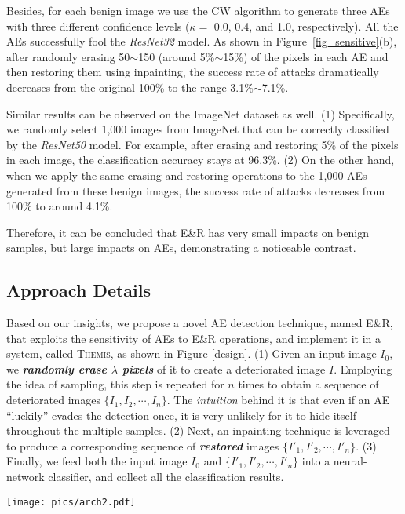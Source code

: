 \documentclass[sigconf]{acmart}
\newcommand{\oursys}{\textsc{Themis}\xspace}
\begin{document}
Besides, for each benign image we use the CW algorithm to generate three AEs  with three 
different confidence levels ($\kappa=$ 0.0, 0.4, and 1.0, respectively). 
All the AEs successfully 
fool the \emph{ResNet32} model. As shown in Figure~\ref{fig_sensitive}(b), after 
randomly erasing  50$\sim$150 (around 5\%$\sim$15\%) of the pixels in each AE and then restoring them using inpainting, the success rate of attacks dramatically decreases from the original 100\% to the range 3.1\%$\sim$7.1\%. 

Similar results can be observed on the ImageNet dataset as well. (1) Specifically, we randomly select
1,000 images from ImageNet that can be correctly classified by the \emph{ResNet50} model. For example,
after erasing and restoring 5\% of the pixels in each image, the classification accuracy 
stays at 96.3\%. (2) On the other hand, when we apply the same erasing and restoring operations to 
the 1,000  AEs generated from 
these benign images, the success rate of attacks decreases from 100\% to around 4.1\%. 

Therefore,  it can be concluded that E\&R has very small impacts on benign samples, but large impacts on AEs, demonstrating a noticeable contrast. 

\subsection{Approach Details} \label{sec:details}

Based on our insights, we propose a novel AE detection technique, named E\&R, that
exploits the sensitivity of AEs to E\&R operations, and implement it in a system, called \oursys, as shown in  Figure \ref{design}.
(1) Given an input image $I_0$, we \textbf{\em randomly erase $\lambda$ pixels} of it to create a deteriorated image $I$. Employing the idea of 
sampling, this step
is repeated for $n$ times to obtain a sequence of deteriorated images $\{I_1, I_2, \cdots, I_n\}$. The \emph{intuition} behind it is that even if an AE ``luckily'' evades 
the detection once, it is very unlikely for it to hide itself throughout the multiple samples. 
(2) Next, an inpainting technique is leveraged to produce a corresponding sequence of \textbf{\em restored} images $\{I'_1, I'_2, \cdots, I'_n\}$. (3) Finally, we feed both the input image $I_0$ and $\{I'_1, I'_2, \cdots, I'_n\}$ into a neural-network classifier, and collect all the classification results. 

\begin{figure*} \centering
\texttt{[image: pics/arch2.pdf]}
\caption{Architecture of \oursys.}\label{design}
\end{figure*}
\end{document}
